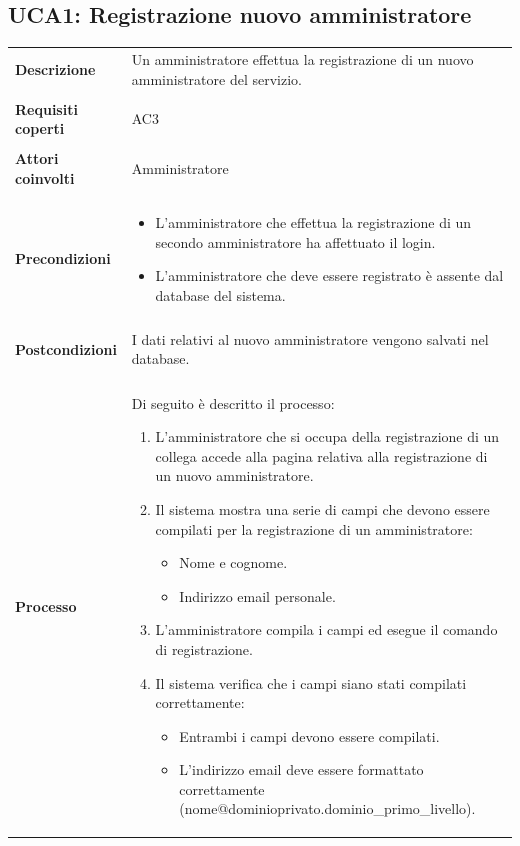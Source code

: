 \documentclass[10pt,a4paper]{report}
\begin{document}
	\subsection{UCA1: Registrazione nuovo amministratore}
	\begin{tabular}{lp{}}
		\textbf{Descrizione}&Un amministratore effettua la registrazione di un nuovo amministratore del servizio.\\
		\\
		\textbf{Requisiti coperti}&AC3\\
		\\
		\textbf{Attori coinvolti}&Amministratore\\
		\\
		\textbf{Precondizioni}&\begin{itemize}
			\item L'amministratore che effettua la registrazione di un secondo amministratore ha affettuato il login.
			\item L'amministratore che deve essere registrato è assente dal database del sistema.
		\end{itemize}\\
		\\
		\textbf{Postcondizioni}&I dati relativi al nuovo amministratore vengono salvati nel database.\\
		\\
		\textbf{Processo}&Di seguito è descritto il processo:
		\begin{enumerate}
			\item L'amministratore che si occupa della registrazione di un collega accede alla pagina relativa alla registrazione di un nuovo amministratore.
			\item Il sistema mostra una serie di campi che devono essere compilati per la registrazione di un amministratore:
			\begin{itemize}
				\item Nome e cognome.
				\item Indirizzo email personale.
			\end{itemize}
			\item L'amministratore compila i campi ed esegue il comando di registrazione.
			\item Il sistema verifica che i campi siano stati compilati correttamente:
			\begin{itemize}
				\item Entrambi i campi devono essere compilati.
				\item L'indirizzo email deve essere formattato correttamente (nome@dominioprivato.dominio\_primo\_livello).

\end{itemize}
\end{enumerate}
\end{tabular}
\end{document}
